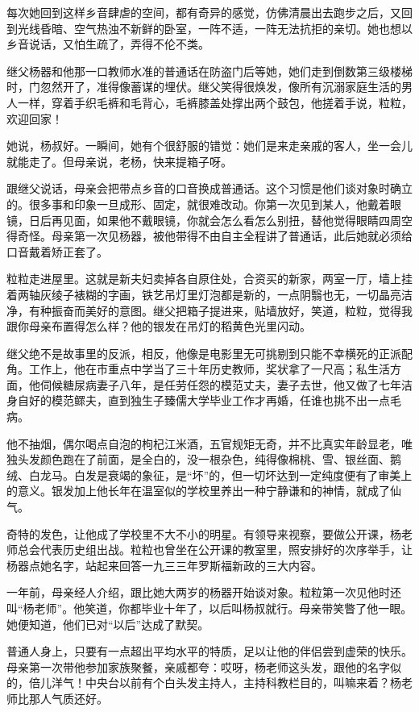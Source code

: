 \documentclass[lang=cn,newtx,12pt,scheme=chinese]{elegantbook}
\begin{document}
每次她回到这样乡音肆虐的空间，都有奇异的感觉，仿佛清晨出去跑步之后，又回到光线昏暗、空气热浊不新鲜的卧室，一阵不适，一阵无法抗拒的亲切。她也想以乡音说话，又怕生疏了，弄得不伦不类。

继父杨器和他那一口教师水准的普通话在防盗门后等她，她们走到倒数第三级楼梯时，门忽然开了，准得像蓄谋的埋伏。继父笑得很焕发，像所有沉溺家庭生活的男人一样，穿着手织毛裤和毛背心，毛裤膝盖处撑出两个鼓包，他搓着手说，粒粒，欢迎回家！

她说，杨叔好。一瞬间，她有个很舒服的错觉：她们是来走亲戚的客人，坐一会儿就能走了。但母亲说，老杨，快来提箱子呀。

跟继父说话，母亲会把带点乡音的口音换成普通话。这个习惯是他们谈对象时确立的。很多事和印象一旦成形、固定，就很难改动。你第一次见到某人，他戴着眼镜，日后再见面，如果他不戴眼镜，你就会怎么看怎么别扭，替他觉得眼睛四周空得奇怪。母亲第一次见杨器，被他带得不由自主全程讲了普通话，此后她就必须给口音戴着矫正套了。

粒粒走进屋里。这就是新夫妇卖掉各自原住处，合资买的新家，两室一厅，墙上挂着两轴灰绫子裱糊的字画，铁艺吊灯里灯泡都是新的，一点阴翳也无，一切晶亮洁净，有种振奋而美好的意图。继父把箱子提进来，贴墙放好，笑道，粒粒，觉得我跟你母亲布置得怎么样？他的银发在吊灯的稻黄色光里闪动。

继父绝不是故事里的反派，相反，他像是电影里无可挑剔到只能不幸横死的正派配角。工作上，他在市重点中学当了三十年历史教师，奖状拿了一尺高；私生活方面，他伺候糖尿病妻子八年，是任劳任怨的模范丈夫，妻子去世，他又做了七年洁身自好的模范鳏夫，直到独生子臻儒大学毕业工作才再婚，任谁也挑不出一点毛病。

他不抽烟，偶尔喝点自泡的枸杞江米酒，五官规矩无奇，并不比真实年龄显老，唯独头发颜色跑在了前面，是全白的，没一根杂色，纯得像棉桃、雪、银丝面、鹅绒、白龙马。白发是衰竭的象征，是“坏”的，但一切坏达到一定纯度便有了审美上的意义。银发加上他长年在温室似的学校里养出一种宁静谦和的神情，就成了仙气。

奇特的发色，让他成了学校里不大不小的明星。有领导来视察，要做公开课，杨老师总会代表历史组出战。粒粒也曾坐在公开课的教室里，照安排好的次序举手，让杨器点她名字，站起来回答一九三三年罗斯福新政的三大内容。

一年前，母亲经人介绍，跟比她大两岁的杨器开始谈对象。粒粒第一次见他时还叫“杨老师”。他笑道，你都毕业十年了，以后叫杨叔就行。母亲带笑瞥了他一眼。她便知道，他们已对“以后”达成了默契。

普通人身上，只要有一点超出平均水平的特质，足以让他的伴侣尝到虚荣的快乐。母亲第一次带他参加家族聚餐，亲戚都夸：哎呀，杨老师这头发，跟他的名字似的，倍儿洋气！中央台以前有个白头发主持人，主持科教栏目的，叫嘛来着？杨老师比那人气质还好。
\end{document}
